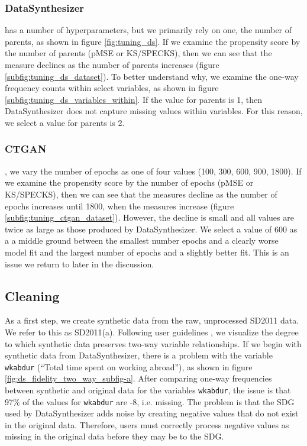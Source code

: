 \documentclass[runningheads]{llncs}
\begin{document}
\subsubsection{DataSynthesizer} has a number of hyperparameters, but we primarily rely on one, the number of parents, as shown in figure \ref{fig:tuning_ds}.  If we examine the propensity score by the number of parents (pMSE or KS/SPECKS), then we can see that the measure declines as the number of parents increases (figure \ref{subfig:tuning_ds_dataset}).  To better understand why, we examine the one-way frequency counts within select variables, as shown in figure \ref{subfig:tuning_ds_variables_within}.  If the value for parents is 1, then DataSynthesizer does not capture missing values within variables.  For this reason, we select a value for parents is 2.

\subsubsection{CTGAN}, we vary the number of epochs as one of four values (100, 300, 600, 900, 1800).  If we examine the propensity score by the number of epochs (pMSE or KS/SPECKS), then we can see that the measures decline as the number of epochs increases until 1800, when the measures increase (figure \ref{subfig:tuning_ctgan_dataset}).  However, the decline is small and all values are twice as large as those produced by DataSynthesizer.  We select a value of 600 as a a middle ground between the smallest number epochs and a clearly worse model fit and the largest number of epochs and a slightly better fit.  This is an issue we return to later in the discussion.  

\subsection{Cleaning}

As a first step, we create synthetic data from the raw, unprocessed SD2011 data.  We refer to this as SD2011(a).  Following user guidelines \cite{raab2021assessing}, we visualize the degree to which synthetic data preserves two-way variable relationships.  If we begin with synthetic data from DataSynthesizer, there is a problem with the variable \texttt{wkabdur} (``Total time spent on working abroad''), as shown in figure \ref{fig:ds_fidelity_two_way_subfig-a}.  After comparing one-way frequencies between synthetic and original data for the variables \texttt{wkabdur}, the issue is that 97\% of the values for \texttt{wkabdur} are -8, i.e. missing.  The problem is that the SDG used by DataSynthesizer adds noise by creating negative values that do not exist in the original data.  Therefore, users must correctly process negative values as missing in the original data before they may be to the SDG.  
\end{document}
